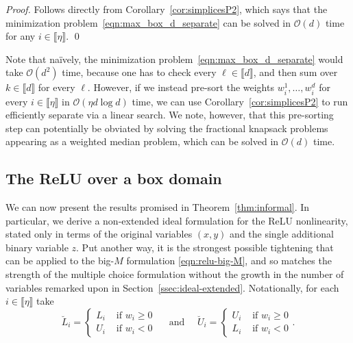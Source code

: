 \documentclass[smallextended]{svjour3}
\newcommand{\gr}{\operatorname{gr}}
\newcommand{\ReLu}{\texttt{ReLU}}
\begin{document}
\begin{proof}
Follows directly from Corollary~\ref{cor:simplicesP2}, which says that the minimization problem~\eqref{eqn:max_box_d_separate} can be solved in $\mathcal{O}(d)$ time for any $i\in\llbracket\eta\rrbracket$.
\qed\end{proof}
Note that na\"{i}vely, the minimization problem~\eqref{eqn:max_box_d_separate} would take $\mathcal{O}(d^2)$ time, because one has to check every $\ell\in\llbracket d\rrbracket$, and then sum over $k\in\llbracket d\rrbracket$ for every $\ell$. However, if we instead pre-sort the weights $w^1_i,\ldots,w^d_i$ for every $i\in\llbracket\eta\rrbracket$ in $\mathcal{O}(\eta d \log d)$ time, we can use Corollary~\ref{cor:simplicesP2} to run efficiently separate via a linear search. We note, however, that this pre-sorting step can potentially be obviated by solving the fractional knapsack problems appearing as a weighted median problem, which can be solved in $\mathcal{O}(d)$ time.

\subsection{The ReLU over a box domain} \label{ssec:relu-box}

We can now present the results promised in Theorem~\ref{thm:informal}. In particular, we derive a non-extended ideal formulation for the ReLU nonlinearity, stated only in terms of the original variables $(x,y)$ and the single additional binary variable $z$. Put another way, it is the strongest possible tightening that can be applied to the big-$M$ formulation \eqref{eqn:relu-big-M}, and so matches the strength of the multiple choice formulation without the growth in the number of variables remarked upon in Section~\ref{ssec:ideal-extended}. Notationally, for each $i \in \llbracket \eta \rrbracket$ take
\[
    \breve{L}_i = \begin{cases} L_i & \text{ if } w_i \geq 0 \\ U_i & \text{ if } w_i < 0 \end{cases} \quad \text{ and } \quad \breve{U}_i = \begin{cases} U_i & \text{ if } w_i \geq 0 \\ L_i & \text{ if } w_i < 0 \end{cases}.
\]
\end{document}
